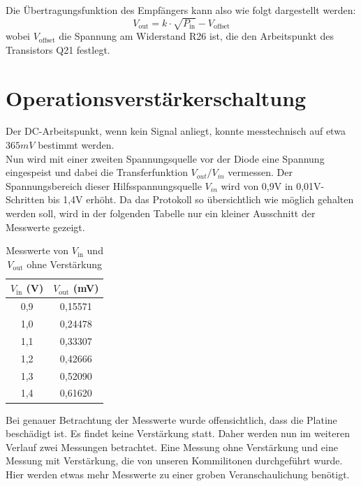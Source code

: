 Die Übertragungsfunktion des Empfängers kann also wie folgt dargestellt werden:
\begin{equation}
    V_\text{out} = k \cdot \sqrt{P_\text{in}} - V_\text{offset}
\end{equation}
wobei \( V_\text{offset} \) die Spannung am Widerstand R26 ist, die den Arbeitspunkt des Transistors Q21 festlegt. 

\section{Operationsverstärkerschaltung} %
Der DC-Arbeitspunkt, wenn kein Signal anliegt, konnte messtechnisch auf etwa $365mV$ bestimmt werden.
\\
Nun wird mit einer zweiten Spannungsquelle vor der Diode eine Spannung eingespeist und dabei die Transferfunktion
$V_{out}/V_{in}$ vermessen. Der Spannungsbereich dieser Hilfsspannungsquelle $V_{in}$ wird von 0,9V in 0,01V-Schritten bis 1,4V erhöht.
Da das Protokoll so übersichtlich wie möglich gehalten werden soll, wird in der folgenden Tabelle nur ein kleiner Ausschnitt der
Messwerte gezeigt.
\begin{table}[h]
\centering
\begin{tabular}{|c|c|}
\hline
$V_{\text{in}}$ (V) & $V_{\text{out}}$ (mV) \\
\hline
0{,}9 & 0{,}15571 \\
1{,}0 & 0{,}24478 \\
1{,}1 & 0{,}33307 \\
1{,}2 & 0{,}42666 \\
1{,}3 & 0{,}52090 \\
1{,}4 & 0{,}61620 \\
\hline
\end{tabular}
\caption{Messwerte von $V_{\text{in}}$ und $V_{\text{out}}$ ohne Verstärkung}
\end{table}
Bei genauer Betrachtung der Messwerte wurde offensichtlich, dass die Platine beschädigt ist. Es findet keine Verstärkung
statt. Daher werden nun im weiteren Verlauf zwei Messungen betrachtet. Eine Messung ohne Verstärkung und eine Messung mit Verstärkung, die von 
unseren Kommilitonen durchgeführt wurde. Hier werden etwas mehr Messwerte zu einer groben Veranschaulichung benötigt. \\


